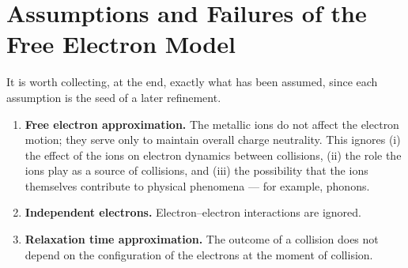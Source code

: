 \section{Assumptions and Failures of the Free Electron Model}

It is worth collecting, at the end, exactly what has been assumed, since each assumption is the seed of a later refinement.

\begin{fact}
\begin{enumerate}
    \item \textbf{Free electron approximation.} The metallic ions do not affect the electron motion; they serve only to maintain overall charge neutrality. This ignores (i) the effect of the ions on electron dynamics between collisions, (ii) the role the ions play as a source of collisions, and (iii) the possibility that the ions themselves contribute to physical phenomena --- for example, phonons.
    \item \textbf{Independent electrons.} Electron--electron interactions are ignored.
    \item \textbf{Relaxation time approximation.} The outcome of a collision does not depend on the configuration of the electrons at the moment of collision.
\end{enumerate}
\end{fact}
